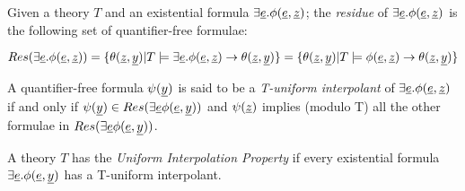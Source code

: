 \begin{definition}
  Given a theory $T$ and an existential formula $\exists \underline{e} . \phi(\underline{e}, \underline{z})$; the 
  \emph{residue} of $\exists \underline{e} . \phi(\underline{e}, \underline{z})$ is the following set of
  quantifier-free formulae:

  \begin{equation*}
    Res(\exists \underline{e} . \phi(\underline{e}, \underline{z})) = \{ \theta(\underline{z}, \underline{y}) | T \models \exists \underline{e} . \phi(\underline{e}, \underline{z}) \rightarrow \theta(\underline{z}, \underline{y}) \} =\{ \theta(\underline{z}, \underline{y}) | T \models \phi(\underline{e}, \underline{z}) \rightarrow \theta(\underline{z}, \underline{y}) \}
  \end{equation*}

  A quantifier-free formula $\psi(\underline{y})$ is said to be a \emph{T-uniform interpolant} 
  of $\exists \underline{e} . \phi(\underline{e}, \underline{z})$ if and only if $\psi(\underline{y}) \in Res(\exists \underline{e} \phi(\underline{e}, \underline{y}))$ and 
  $\psi(\underline{z})$ implies (modulo T)
  all the other formulae in $Res(\exists \underline{e} \phi(\underline{e}, \underline{y}))$.

  A theory $T$ has the \emph{Uniform Interpolation Property} 
  if every existential formula
  $\exists \underline{e} . \phi(\underline{e},\underline{y})$ has a T-uniform interpolant. 

\end{definition}

